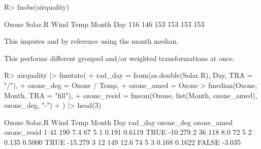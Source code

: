 \documentclass[article]{jss}
\begin{document}
%
\begin{Schunk}
\begin{Sinput}
R> fnobs(airquality)
\end{Sinput}
\begin{Soutput}
  Ozone Solar.R    Wind    Temp   Month     Day 
    116     146     153     153     153     153 
\end{Soutput}
\end{Schunk}
This imputes  and  by reference using the month median.
\begin{Schunk}
\end{Schunk}
This performs different grouped and/or weighted transformations at once.
\begin{Schunk}
\begin{Sinput}
R> airquality |> fmutate(
+    rad_day = fsum(as.double(Solar.R), Day, TRA = "/"),
+    ozone_deg = Ozone / Temp,
+    ozone_amed = Ozone > fmedian(Ozone, Month, TRA = "fill"),
+    ozone_resid = fmean(Ozone, list(Month, ozone_amed), ozone_deg, "-")
+    ) |> head(3)
\end{Sinput}
\begin{Soutput}
  Ozone Solar.R Wind Temp Month Day rad_day ozone_deg ozone_amed ozone_resid
1    41     190  7.4   67     5   1   0.191    0.6119       TRUE     -10.279
2    36     118  8.0   72     5   2   0.135    0.5000       TRUE     -15.279
3    12     149 12.6   74     5   3   0.168    0.1622      FALSE      -3.035
\end{Soutput}
\end{Schunk}
%
\end{document}
